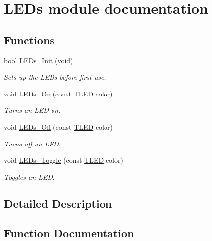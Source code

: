 \hypertarget{group___l_e_ds__module}{}\section{L\+E\+Ds module documentation}
\label{group___l_e_ds__module}
\subsection*{Functions}
\begin{DoxyCompactItemize}
\item 
bool \hyperlink{group___l_e_ds__module_gaea5d2a9d1aacacc05e4d772a555b2d9d}{L\+E\+Ds\+\_\+\+Init} (void)
\begin{DoxyCompactList}\small\item\em Sets up the L\+E\+Ds before first use. \end{DoxyCompactList}\item 
void \hyperlink{group___l_e_ds__module_ga1e5974ccd48f4e74eb3be78a51ebf16f}{L\+E\+Ds\+\_\+\+On} (const \hyperlink{_l_e_ds_8h_a833ecccaa4c55e8365e84d6c02f92ec1}{T\+L\+E\+D} color)
\begin{DoxyCompactList}\small\item\em Turns an L\+E\+D on. \end{DoxyCompactList}\item 
void \hyperlink{group___l_e_ds__module_gaefecb26a8d3457bc7f7a7b2fb8b7311f}{L\+E\+Ds\+\_\+\+Off} (const \hyperlink{_l_e_ds_8h_a833ecccaa4c55e8365e84d6c02f92ec1}{T\+L\+E\+D} color)
\begin{DoxyCompactList}\small\item\em Turns off an L\+E\+D. \end{DoxyCompactList}\item 
void \hyperlink{group___l_e_ds__module_ga00b9c778cd7168ea0df402b263a609bb}{L\+E\+Ds\+\_\+\+Toggle} (const \hyperlink{_l_e_ds_8h_a833ecccaa4c55e8365e84d6c02f92ec1}{T\+L\+E\+D} color)
\begin{DoxyCompactList}\small\item\em Toggles an L\+E\+D. \end{DoxyCompactList}\end{DoxyCompactItemize}


\subsection{Detailed Description}


\subsection{Function Documentation}
\hypertarget{group___l_e_ds__module_gaea5d2a9d1aacacc05e4d772a555b2d9d}{}
